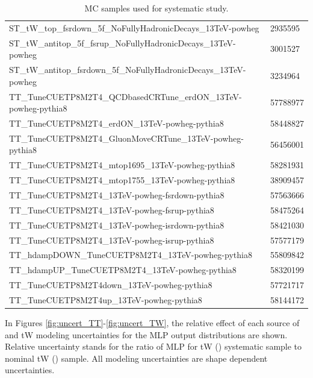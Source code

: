 \begin{table}[h]
{\begin{tabular}{l|l}
ST\_tW\_top\_fsrdown\_5f\_NoFullyHadronicDecays\_13TeV-powheg                &2935595\\
ST\_tW\_antitop\_5f\_fsrup\_NoFullyHadronicDecays\_13TeV-powheg              &3001527\\
ST\_tW\_antitop\_fsrdown\_5f\_NoFullyHadronicDecays\_13TeV-powheg            &3234964\\
\hline
TT\_TuneCUETP8M2T4\_QCDbasedCRTune\_erdON\_13TeV-powheg-pythia8              &57788977\\
TT\_TuneCUETP8M2T4\_erdON\_13TeV-powheg-pythia8                              &58448827\\
TT\_TuneCUETP8M2T4\_GluonMoveCRTune\_13TeV-powheg-pythia8                    &56456001\\
TT\_TuneCUETP8M2T4\_mtop1695\_13TeV-powheg-pythia8                           &58281931\\
TT\_TuneCUETP8M2T4\_mtop1755\_13TeV-powheg-pythia8                           &38909457\\
TT\_TuneCUETP8M2T4\_13TeV-powheg-fsrdown-pythia8                             &57563666\\
TT\_TuneCUETP8M2T4\_13TeV-powheg-fsrup-pythia8                               &58475264\\
TT\_TuneCUETP8M2T4\_13TeV-powheg-isrdown-pythia8                             &58421030\\
TT\_TuneCUETP8M2T4\_13TeV-powheg-isrup-pythia8                               &57577179\\
TT\_hdampDOWN\_TuneCUETP8M2T4\_13TeV-powheg-pythia8                          &55809842\\
TT\_hdampUP\_TuneCUETP8M2T4\_13TeV-powheg-pythia8                            &58320199\\
TT\_TuneCUETP8M2T4down\_13TeV-powheg-pythia8                                 &57721717\\
TT\_TuneCUETP8M2T4up\_13TeV-powheg-pythia8                                   &58144172\\
\hline
\hline
\end{tabular}}
\caption{MC samples used for systematic study.}
\label{mc-samples-sys}
\end{table}


 In Figures \ref{fig:uncert_TT}-\ref{fig:uncert_TW}, the relative effect of each source of \ttbar and tW modeling uncertainties for the MLP output distributions are shown. Relative uncertainty stands for the ratio of MLP for tW (\ttbar) systematic sample to nominal tW (\ttbar) sample. All modeling uncertainties are shape dependent uncertainties.


